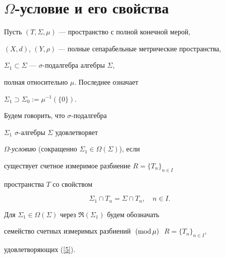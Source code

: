 \section{$\Omega$-условие и его свойства}





Пусть $(T,\Sigma,\mu)$ --- пространство с полной конечной мерой,


$(X,d)$, $(Y,\rho)$ --- полные сепарабельные метрические пространства,


$\Sigma_1\subset\Sigma$ --- $\sigma$-под\-ал\-геб\-ра алгебры $\Sigma$,


полная относительно $\mu$. Последнее означает


$\Sigma_1\supset\Sigma_0:=\mu^{-1}(\{0\})$.





\begin{defn}


Будем говорить, что $\sigma$-по\-дал\-геб\-ра


$\Sigma_1$\; $\sigma$-алгебры $\Sigma$ удовлетворяет


$\Omega$-{\it ус\-ло\-вию} (со\-кра\-щен\-но $\Sigma_1\in{\Omega}


(\Sigma)$), если


существует счетное измеримое разбиение $R=\{T_n\}_{n\in I}$


пространства $T$ со свойством


\begin{equation}


\label{5}


\Sigma_1\cap T_n=\Sigma\cap T_n, \quad n\in I.


\end{equation}


\end{defn}





Для $\Sigma_1\in{\Omega}(\Sigma)$ через $\Re(\Sigma_1)$ будем обозначать


семейство счетных измеримых разбиений $\;(\mathrm{mod}\,\mu)\;$ $R=\{T_n\}_{n\in I}$,


удовлетворяющих (\ref{5}).





